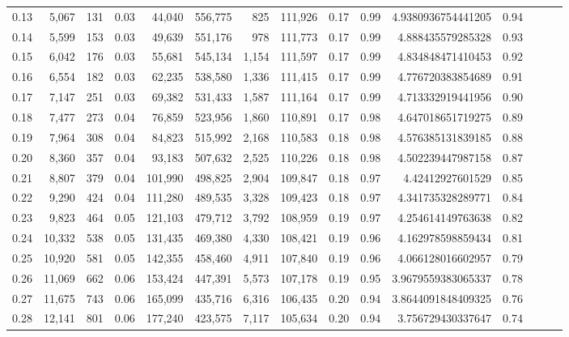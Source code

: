 \begin{tabular}{rrrrrrrrrrrrrrr}
0.13 &   5,067 &    131 &  0.03 &   44,040 &  556,775 &      825 &  111,926 &  0.17 &  0.99 &    4.9380936754441205 &      0.94 \\
0.14 &   5,599 &    153 &  0.03 &   49,639 &  551,176 &      978 &  111,773 &  0.17 &  0.99 &     4.888435579285328 &      0.93 \\
0.15 &   6,042 &    176 &  0.03 &   55,681 &  545,134 &    1,154 &  111,597 &  0.17 &  0.99 &     4.834848471410453 &      0.92 \\
0.16 &   6,554 &    182 &  0.03 &   62,235 &  538,580 &    1,336 &  111,415 &  0.17 &  0.99 &     4.776720383854689 &      0.91 \\
0.17 &   7,147 &    251 &  0.03 &   69,382 &  531,433 &    1,587 &  111,164 &  0.17 &  0.99 &     4.713332919441956 &      0.90 \\
0.18 &   7,477 &    273 &  0.04 &   76,859 &  523,956 &    1,860 &  110,891 &  0.17 &  0.98 &     4.647018651719275 &      0.89 \\
0.19 &   7,964 &    308 &  0.04 &   84,823 &  515,992 &    2,168 &  110,583 &  0.18 &  0.98 &     4.576385131839185 &      0.88 \\
0.20 &   8,360 &    357 &  0.04 &   93,183 &  507,632 &    2,525 &  110,226 &  0.18 &  0.98 &     4.502239447987158 &      0.87 \\
0.21 &   8,807 &    379 &  0.04 &  101,990 &  498,825 &    2,904 &  109,847 &  0.18 &  0.97 &      4.42412927601529 &      0.85 \\
0.22 &   9,290 &    424 &  0.04 &  111,280 &  489,535 &    3,328 &  109,423 &  0.18 &  0.97 &     4.341735328289771 &      0.84 \\
0.23 &   9,823 &    464 &  0.05 &  121,103 &  479,712 &    3,792 &  108,959 &  0.19 &  0.97 &     4.254614149763638 &      0.82 \\
0.24 &  10,332 &    538 &  0.05 &  131,435 &  469,380 &    4,330 &  108,421 &  0.19 &  0.96 &     4.162978598859434 &      0.81 \\
0.25 &  10,920 &    581 &  0.05 &  142,355 &  458,460 &    4,911 &  107,840 &  0.19 &  0.96 &     4.066128016602957 &      0.79 \\
0.26 &  11,069 &    662 &  0.06 &  153,424 &  447,391 &    5,573 &  107,178 &  0.19 &  0.95 &    3.9679559383065337 &      0.78 \\
0.27 &  11,675 &    743 &  0.06 &  165,099 &  435,716 &    6,316 &  106,435 &  0.20 &  0.94 &    3.8644091848409325 &      0.76 \\
0.28 &  12,141 &    801 &  0.06 &  177,240 &  423,575 &    7,117 &  105,634 &  0.20 &  0.94 &     3.756729430337647 &      0.74 \\

\end{tabular}
